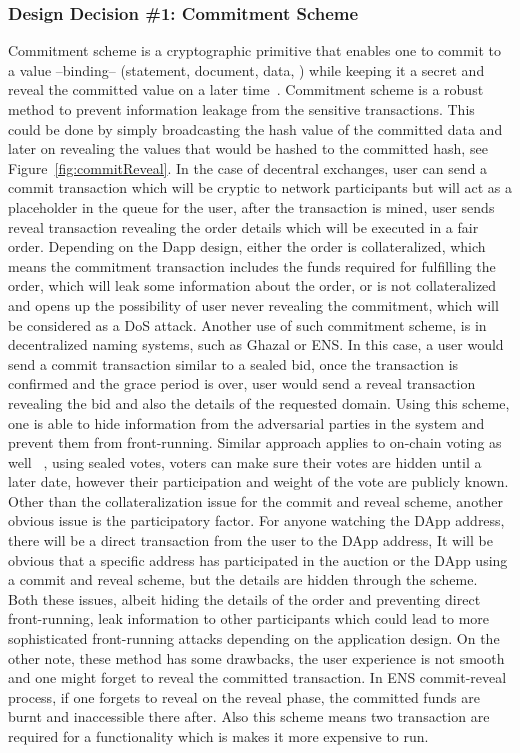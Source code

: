 \subsubsection{Design Decision \#1: Commitment Scheme\newline} \label{CommitmentScheme} %
Commitment scheme is a cryptographic primitive that enables one to commit to a value --binding-- (\eg statement, document, data, \etc) while keeping it a secret and reveal the committed value on a later time~\cite{brassard1988minimum}. Commitment scheme is a robust method to prevent information leakage from the sensitive transactions. This could be done by simply broadcasting the hash value of the committed data and later on revealing the values that would be hashed to the committed hash, see Figure~\ref{fig:commitReveal}. 
In the case of decentral exchanges, user can send a commit transaction which will be cryptic to network participants but will act as a placeholder in the queue for the user, after the transaction is mined, user sends reveal transaction revealing the order details which will be executed in a fair order. Depending on the Dapp design, either the order is collateralized, which means the commitment transaction includes the funds required for fulfilling the order, which will leak some information about the order, or is not collateralized and opens up the possibility of user never revealing the commitment, which will be considered as a DoS attack. 
Another use of such commitment scheme, is in decentralized naming systems, such as Ghazal or ENS. In this case, a user would send a commit transaction similar to a sealed bid, once the transaction is confirmed and the grace period is over, user would send a reveal transaction revealing the bid and also the details of the requested domain. Using this scheme, one is able to hide information from the adversarial parties in the system and prevent them from front-running. Similar approach applies to on-chain voting as well ~\cite{adChainPLCRVoting}, using sealed votes, voters can make sure their votes are hidden until a later date, however their participation and weight of the vote are publicly known. 
Other than the collateralization issue for the commit and reveal scheme, another obvious issue is the participatory factor. For anyone watching the DApp address, there will be a direct transaction from the user to the DApp address, It will be obvious that a specific address has participated in the auction or the DApp using a commit and reveal scheme, but the details are hidden through the scheme. Both these issues, albeit hiding the details of the order and preventing direct front-running, leak information to other participants which could lead to more sophisticated front-running attacks depending on the application design. On the other note, these method has some drawbacks, the user experience is not smooth and one might forget to reveal the committed transaction. In ENS commit-reveal process, if one forgets to reveal on the reveal phase, the committed funds are burnt and inaccessible there after. Also this scheme means two transaction are required for a functionality which is makes it more expensive to run.

